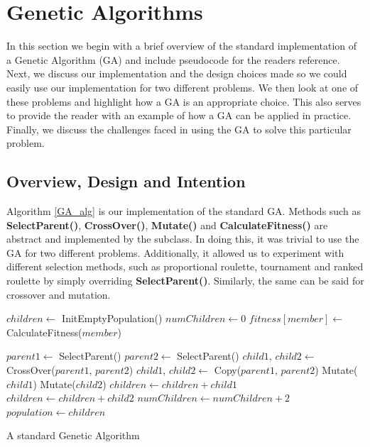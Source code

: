 \section{Genetic Algorithms}
In this section we begin with a brief overview of the standard implementation of a Genetic Algorithm (GA) and include
pseudocode for the readers reference. Next, we discuss our implementation and the design choices made so we could easily
use our implementation for two different problems. We then look at one of these problems and highlight how a GA is an
appropriate choice. This also serves to provide the reader with an example of how a GA can be applied in practice.
Finally, we discuss the challenges faced in using the GA to solve this particular problem.


\subsection{Overview, Design and Intention}
Algorithm \ref{GA_alg} is our implementation of the standard GA. Methods such as \textbf{SelectParent()}, \textbf{CrossOver()}, \textbf{Mutate()} and \textbf{CalculateFitness()} are abstract and implemented by the subclass.
In doing this, it was trivial to use the GA for two different problems. Additionally, it allowed us to experiment with 
different selection methods, such as proportional roulette, tournament and ranked roulette by simply 
overriding \textbf{SelectParent()}. Similarly, the same can be said for crossover and mutation.
\begin{algorithm}[h]
\begin{algorithmic}
\State $children \gets$ InitEmptyPopulation()
\State $numChildren \gets 0$ 
	\State $fitness[member] \gets$ CalculateFitness($member$)
\EndFor

	\State $parent1 \gets$ SelectParent()
	\State $parent2 \gets$ SelectParent()
		\State $child1$, $child2 \gets $ CrossOver($parent1$, $parent2$)
	\Else
		\State $child1$, $child2 \gets $ Copy($parent1$, $parent2$)
	\EndIf
	\State Mutate($child1$) 
	\State Mutate($child2$) 
	\State $children \gets children + child1$
	\State $children \gets children + child2$
	\State $numChildren \gets numChildren + 2$
\EndWhile
\State $population \gets children$ 
\caption{A standard Genetic Algorithm}
\label{GA_alg}
\end{algorithmic}
\end{algorithm}


